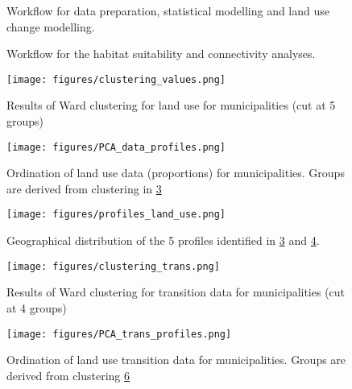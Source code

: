 \begin{figure}[h]
\caption{Workflow for data preparation, statistical modelling and land use change modelling.}
\label{fig:workflow1}
\end{figure}
\clearpage

\begin{figure}[h!]
\caption{Workflow for the habitat suitability and connectivity analyses.} 
\label{fig:workflow2}
\end{figure}
\clearpage


\begin{figure}[h!]
\centering
 \texttt{[image: figures/clustering\_values.png]}
 \caption{Results of Ward clustering for land use for municipalities (cut at 5 groups)}
 \label{fig:clustervals}
\end{figure}

\begin{figure}[h!]
  \centering
    \texttt{[image: figures/PCA\_data\_profiles.png]}
  \caption{Ordination of land use data (proportions) for municipalities. Groups are derived from clustering in \ref{fig:clustervals}}
  \label{fig:PCAvals}
\end{figure}

\begin{figure}[h!]
  \centering
    \texttt{[image: figures/profiles\_land\_use.png]}
  \caption{Geographical distribution of the 5 profiles identified in \ref{fig:clustervals} and \ref{fig:PCAvals}.}
  \label{fig:mapvals}
\end{figure}

\begin{figure}[h!]
  \centering
    \texttt{[image: figures/clustering\_trans.png]}
  \caption{Results of Ward clustering for transition data for municipalities (cut at 4 groups)}
  \label{fig:clustertrans}
\end{figure}

\begin{figure}[h!]
  \centering
    \texttt{[image: figures/PCA\_trans\_profiles.png]}
  \caption{Ordination of land use transition data for municipalities. Groups are derived from clustering \ref{fig:clustertrans}}
  \label{fig:PCAtrans}
\end{figure}

